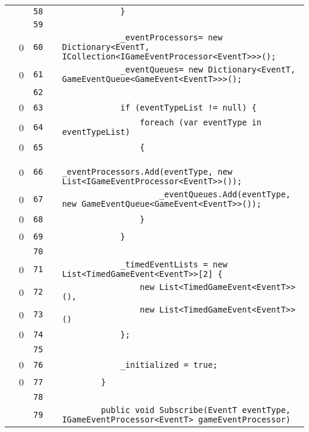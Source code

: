 \documentclass[a4paper,landscape,10pt]{article}
\begin{document}
\begin{longtable}[l]{lrrll}
\cellcolor{gray} &  & \verb~58~ & & \verb~            }~\\
\cellcolor{gray} &  & \verb~59~ & & \verb~~\\
\cellcolor{red} & 0 & \verb~60~ & & \verb~            _eventProcessors= new Dictionary<EventT, ICollection<IGameEventProcessor<EventT>>>();~\\
\cellcolor{red} & 0 & \verb~61~ & & \verb~            _eventQueues= new Dictionary<EventT, GameEventQueue<GameEvent<EventT>>>();~\\
\cellcolor{gray} &  & \verb~62~ & & \verb~~\\
\cellcolor{red} & 0 & \verb~63~ & & \verb~            if (eventTypeList != null) {~\\
\cellcolor{red} & 0 & \verb~64~ & & \verb~                foreach (var eventType in eventTypeList)~\\
\cellcolor{red} & 0 & \verb~65~ & & \verb~                {~\\
\cellcolor{red} & 0 & \verb~66~ & & \verb~                    _eventProcessors.Add(eventType, new List<IGameEventProcessor<EventT>>());~\\
\cellcolor{red} & 0 & \verb~67~ & & \verb~                    _eventQueues.Add(eventType, new GameEventQueue<GameEvent<EventT>>());~\\
\cellcolor{red} & 0 & \verb~68~ & & \verb~                }~\\
\cellcolor{red} & 0 & \verb~69~ & & \verb~            }~\\
\cellcolor{gray} &  & \verb~70~ & & \verb~~\\
\cellcolor{red} & 0 & \verb~71~ & & \verb~            _timedEventLists = new List<TimedGameEvent<EventT>>[2] {~\\
\cellcolor{red} & 0 & \verb~72~ & & \verb~                new List<TimedGameEvent<EventT>>(),~\\
\cellcolor{red} & 0 & \verb~73~ & & \verb~                new List<TimedGameEvent<EventT>>()~\\
\cellcolor{red} & 0 & \verb~74~ & & \verb~            };~\\
\cellcolor{gray} &  & \verb~75~ & & \verb~~\\
\cellcolor{red} & 0 & \verb~76~ & & \verb~            _initialized = true;~\\
\cellcolor{red} & 0 & \verb~77~ & & \verb~        }~\\
\cellcolor{gray} &  & \verb~78~ & & \verb~~\\
\cellcolor{gray} &  & \verb~79~ & & \verb~        public void Subscribe(EventT eventType, IGameEventProcessor<EventT> gameEventProcessor)~\\

\end{longtable}
\end{document}
